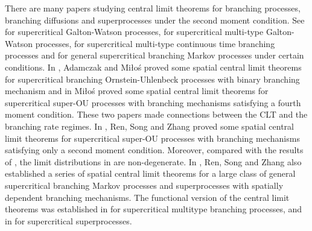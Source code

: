 \documentclass[12pt,a4paper]{amsart}
\theoremstyle{plain}
\theoremstyle{definition}
\numberwithin{equation}{section}
\begin{document}
    There are many papers studying central limit theorems for branching processes, branching diffusions and superprocesses under the second moment condition.
    See
    \cite{Heyde1970A-rate, HeydeBrown1871An-invariance, HeydeLeslie1971Improved} for supercritical Galton-Watson processes,
    \cite{KestenStigum1966Additional,KestenStigum1966A-limit} for supercritical multi-type Galton-Watson processes,
    \cite{Athreya1969Limit,Athreya1969LimitB,Athreya1971Some} for supercritical multi-type continuous time branching processes and \cite{AsmussenHering1983Branching} for general supercritical branching Markov processes under certain conditions.
    In \cite{AdamczakMilos2015CLT},
    Adamczak and Mi\l{}o\'s proved some spatial central limit theorems for 
    supercritical branching Ornstein-Uhlenbeck processes with binary branching mechanism and in \cite{Milos2012Spatial} 
    Mi\l{}o\'s proved some spatial central limit theorems for 
    supercritical super-OU processes with branching mechanisms satisfying a fourth moment condition.
    These two papers made connections between the CLT and  the branching rate regimes.
    In \cite{RenSongZhang2014Central}, Ren, Song and Zhang proved some spatial central limit theorems for supercritical super-OU 
    processes with branching mechanisms satisfying 
    only a second moment condition.
    Moreover,
    compared with the results of \cite{AdamczakMilos2015CLT,Milos2012Spatial}, the limit distributions in \cite{RenSongZhang2014Central} are non-degenerate.
    In \cite{RenSongZhang2014CentralB,RenSongZhang2015Central,RenSongZhang2017Central},
    Ren, Song and Zhang also established a series of spatial central limit theorems for a large class of general 
    supercritical branching Markov processes and superprocesses with spatially dependent branching mechanisms.
    The functional version of the central limit theorems was established in \cite{Janson2004Functional} for supercritical multitype branching processes, and  in \cite{RenSongZhang2017Functional} for supercritical superprocesses.
\end{document}
